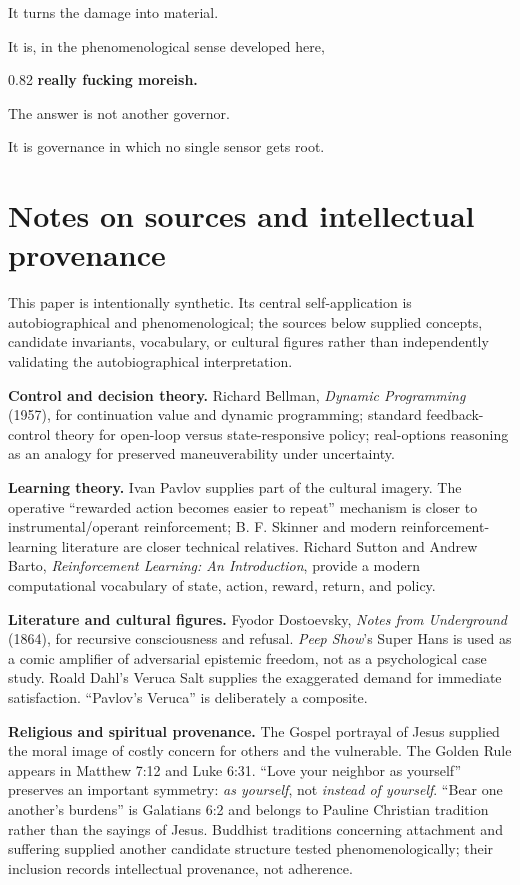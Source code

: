 \documentclass[10pt,letterpaper]{article}
\newenvironment{paperbody}
  {\begingroup\justifying}
  {\par\endgroup}
\newenvironment{thesisbox}
  {\Needspace{3.5\baselineskip}\par\vspace{0.32em}\begin{center}\begingroup
   \begin{lrbox}{\thesisboxsave}\begin{varwidth}{0.82\linewidth}
   \normalsize\rmfamily\bfseries\upshape\RaggedRight}
  {\end{varwidth}\end{lrbox}\fbox{\usebox{\thesisboxsave}}
   \endgroup\end{center}\vspace{0.32em}}
\let\oldsection\section
\renewcommand{\section}{\Needspace{6\baselineskip}\oldsection}
\begin{document}
\begin{paperbody}
It turns the damage into material.

It is, in the phenomenological sense developed here,

\begin{thesisbox}
really fucking moreish.
\end{thesisbox}

The answer is not another governor.

It is governance in which no single sensor gets root.

\bigskip

\section*{Notes on sources and intellectual
provenance}

This paper is intentionally synthetic. Its central self-application is
autobiographical and phenomenological; the sources below supplied
concepts, candidate invariants, vocabulary, or cultural figures rather
than independently validating the autobiographical interpretation.

\textbf{Control and decision theory.} Richard Bellman, \emph{Dynamic
Programming} (1957), for continuation value and dynamic programming;
standard feedback-control theory for open-loop versus state-responsive
policy; real-options reasoning as an analogy for preserved
maneuverability under uncertainty.

\textbf{Learning theory.} Ivan Pavlov supplies part of the cultural
imagery. The operative ``rewarded action becomes easier to repeat''
mechanism is closer to instrumental/operant reinforcement; B. F. Skinner
and modern reinforcement-learning literature are closer technical
relatives. Richard Sutton and Andrew Barto, \emph{Reinforcement
Learning: An Introduction}, provide a modern computational vocabulary of
state, action, reward, return, and policy.

\textbf{Literature and cultural figures.} Fyodor Dostoevsky, \emph{Notes
from Underground} (1864), for recursive consciousness and refusal.
\emph{Peep Show}'s Super Hans is used as a comic amplifier of
adversarial epistemic freedom, not as a psychological case study. Roald
Dahl's Veruca Salt supplies the exaggerated demand for immediate
satisfaction. ``Pavlov's Veruca'' is deliberately a composite.

\textbf{Religious and spiritual provenance.} The Gospel portrayal of
Jesus supplied the moral image of costly concern for others and the
vulnerable. The Golden Rule appears in Matthew 7:12 and Luke 6:31.
``Love your neighbor as yourself'' preserves an important symmetry:
\emph{as yourself}, not \emph{instead of yourself}. ``Bear one another's
burdens'' is Galatians 6:2 and belongs to Pauline Christian tradition
rather than the sayings of Jesus. Buddhist traditions concerning
attachment and suffering supplied another candidate structure tested
phenomenologically; their inclusion records intellectual provenance, not
adherence.


\end{paperbody}
\end{document}
